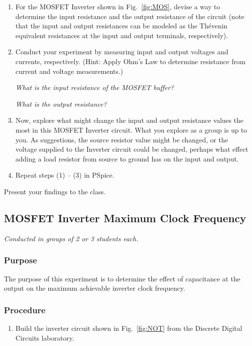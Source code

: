 \documentclass[12pt]{../manual}
\begin{document}
\begin{enumerate}
\item For the MOSFET Inverter shown in Fig.~\ref{fig:MOS}, devise a way to determine the input resistance and the output resistance of the circuit (note that the input and output resistances can be modeled as the Th\'evenin equivalent resistances at the input and output terminals, respectively).

\item Conduct your experiment by measuring input and output voltages and currents, respectively. (Hint: Apply Ohm's Law to determine resistance from current and voltage measurements.)

{\it What is the input resistance of the MOSFET buffer?}

{\it What is the output resistance?}

\item Now, explore what might change the input and output resistance values the most in this MOSFET Inverter circuit. What you explore as a group is up to you. As suggestions, the source resistor value might be changed, or the voltage supplied to the Inverter circuit could be changed, perhaps what effect adding a load resistor from source to ground has on the input and output.

\item Repeat steps (1) -- (3) in PSpice.
\end{enumerate}

Present your findings to the class.

\newpage
\subsection{MOSFET Inverter Maximum Clock Frequency}
\textit{Conducted in groups of 2 or 3 students each.}

\subsubsection*{Purpose}
The purpose of this experiment is to determine the effect of capacitance at the output on the maximum achievable inverter clock frequency.

\subsubsection*{Procedure}
\begin{enumerate}
\item Build the inverter circuit shown in Fig.~\ref{fig:NOT} from the Discrete Digital Circuits laboratory.
\end{enumerate}
\end{document}
